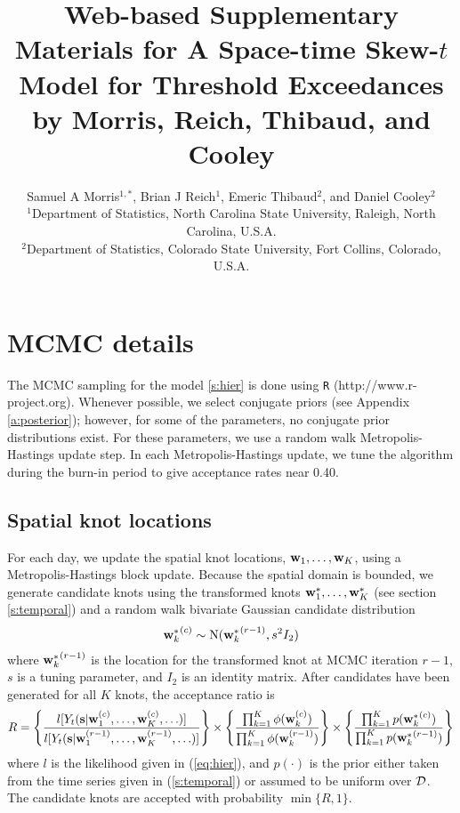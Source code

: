 \documentclass[useAMS,usenatbib,referee]{biomweb}
\title[Web-based Supplementary Materials for A Space-time Skew-$t$ Model for Threshold Exceedances]{Web-based Supplementary Materials for A Space-time Skew-$t$ Model for Threshold Exceedances by Morris, Reich, Thibaud, and Cooley}
\author
{Samuel A Morris$^{1,*}$\email{samorris@ncsu.edu},
Brian J Reich$^{1}$,
Emeric Thibaud$^{2}$, and
Daniel Cooley$^{2}$\\
$^{1}$Department of Statistics, North Carolina State University, Raleigh, North Carolina, U.S.A. \\
$^{2}$Department of Statistics, Colorado State University, Fort Collins, Colorado, U.S.A.}
\begin{document}
\maketitle



\renewcommand{\thesection}{Web Appendix \Alph{section}}

\section{MCMC details} \label{a:mcmc}
The MCMC sampling for the model \ref{s:hier} is done using {\tt R} (http://www.r-project.org). Whenever possible, we select conjugate priors (see Appendix \ref{a:posterior}); however, for some of the parameters, no conjugate prior distributions exist.
For these parameters, we use a random walk Metropolis-Hastings update step.
In each Metropolis-Hastings update, we tune the algorithm during the burn-in period to give acceptance rates near 0.40.

\subsection*{Spatial knot locations}
For each day, we update the spatial knot locations, $\mbox{\bf w}_1, \ldots, \mbox{\bf w}_K$, using a Metropolis-Hastings block update.
Because the spatial domain is bounded, we generate candidate knots using the transformed knots $\mbox{\bf w}^*_1, \ldots, \mbox{\bf w}^*_K$ (see section \ref{s:temporal}) and a random walk bivariate Gaussian candidate distribution
\begin{align*}
	{ \mbox{\bf w}^*_k}^{(c)} \sim \text{N}({\mbox{\bf w}^*_k}^{(r - 1)}, s^2 I_2)
\end{align*}
where ${\mbox{\bf w}^*_k}^{(r - 1)}$ is the location for the transformed knot at MCMC iteration $r - 1$, $s$ is a tuning parameter, and $I_2$ is an identity matrix.
After candidates have been generated for all $K$ knots, the acceptance ratio is
\begin{align*}
  R = \left\{ \frac{ l[ Y_t(\mbox{\bf s} | \mbox{\bf w}_1^{(c)}, \ldots, \mbox{\bf w}_K^{(c)}, \ldots)] }{l[ Y_t(\mbox{\bf s} | \mbox{\bf w}_1^{(r - 1)}, \ldots, \mbox{\bf w}_K^{(r - 1)}, \ldots)]} \right\} \times \left\{ \frac{ \prod_{k = 1}^{K}\phi(\mbox{\bf w}_k^{(c)})}{ \prod_{k = 1}^{K}\phi(\mbox{\bf w}_k^{(r - 1)})} \right\} \times \left\{ \frac{ \prod_{k = 1}^{K} p({\mbox{\bf w}^*_k}^{(c)})}{ \prod_{k = 1}^{K} p({\mbox{\bf w}^*_k}^{(r - 1)})}\right\}
\end{align*}
where $l$ is the likelihood given in (\ref{eq:hier}), and $p(\cdot)$ is the prior either taken from the time series given in (\ref{s:temporal}) or assumed to be uniform over $\calD$.
The candidate knots are accepted with probability $\min\{R, 1\}$.
\end{document}
